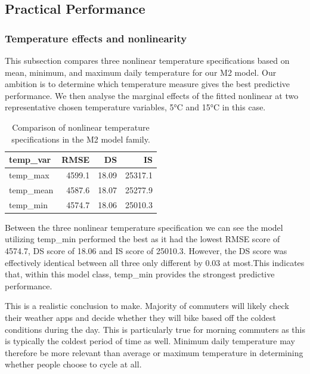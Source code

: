\documentclass[
]{article}
\begin{document}
\subsection{Practical Performance}\label{practical-performance}

\subsubsection{Temperature effects and nonlinearity}\label{temperature-effects-and-nonlinearity}

This subsection compares three nonlinear temperature specifications based on mean, minimum, and maximum daily temperature for our M2 model. Our ambition is to determine which temperature measure gives the best predictive performance. We then analyse the marginal effects of the fitted nonlinear at two representative chosen temperature variables, 5°C and 15°C in this case.

\begin{table}[!h]
\centering
\caption{\label{tab:unnamed-chunk-5}Comparison of nonlinear temperature specifications in the M2 model family.}
\centering
\begin{tabular}[t]{lrrr}
\toprule
temp\_var & RMSE & DS & IS\\
\midrule
temp\_max & 4599.1 & 18.09 & 25317.1\\
temp\_mean & 4587.6 & 18.07 & 25277.9\\
temp\_min & 4574.7 & 18.06 & 25010.3\\
\bottomrule
\end{tabular}
\end{table}

Between the three nonlinear temperature specification we can see the model utilizing temp\_min performed the best as it had the lowest RMSE score of 4574.7, DS score of 18.06 and IS score of 25010.3. However, the DS score was effectively identical between all three only different by 0.03 at most.This indicates that, within this model class, temp\_min provides the strongest predictive performance.

This is a realistic conclusion to make. Majority of commuters will likely check their weather apps and decide whether they will bike based off the coldest conditions during the day. This is particularly true for morning commuters as this is typically the coldest period of time as well. Minimum daily temperature may therefore be more relevant than average or maximum temperature in determining whether people choose to cycle at all.
\end{document}
